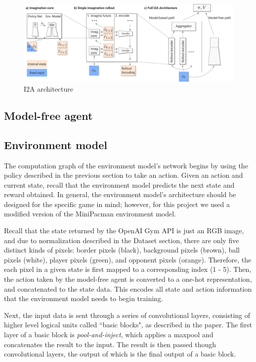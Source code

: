 \documentclass[10pt, twocolumn]{article}
\begin{document}
\begin{figure}
\centering
\includegraphics[scale=0.3]{i2a}
\caption{I2A architecture}
\end{figure}

\subsection{Model-free agent}

\subsection{Environment model}

The computation graph of the environment model's network begins by using the policy described in the
previous section to take an action. Given an action and current state, recall that the environment model
predicts the next state and reward obtained. In general, the environment model's architecture should be
designed for the specific game in mind; however, for this project we used a modified version of the
MiniPacman environment model.

Recall that the state returned by the OpenAI Gym API is just an RGB image, and due to normalization 
described in the Dataset section, there are only five distinct kinds of pixels: border pixels (black),
background pixels (brown), ball pixels (white), player pixels (green), and opponent pixels (orange).
Therefore, the each pixel in a given state is first mapped to a corresponding index (1 - 5). Then, the action
taken by the model-free agent is converted to a one-hot representation, and concatenated to the
state data. This encodes all state and action information that the environment model needs to begin training.

Next, the input data is sent through a series of convolutional layers, consisting of higher level logical units
called ``basic blocks", as described in the paper. The first layer of a basic block is \emph{pool-and-inject},
which applies a maxpool and concatenates the result to the input. The result is then passed though
convolutional layers, the output of which is the final output of a basic block.
\end{document}
